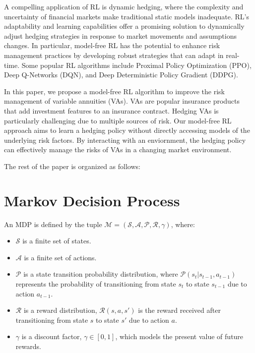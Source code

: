 A compelling application of RL is dynamic hedging, where the complexity and uncertainty of financial markets make traditional static models inadequate.
RL's adaptability and learning capabilities offer a promising solution to dynamically adjust hedging strategies in response to market movements and assumptions changes.
In particular, model-free RL has the potential to enhance risk management practices by developing robust strategies that can adapt in real-time.
Some popular RL algorithms include Proximal Policy Optimization (PPO), Deep Q-Networks (DQN), and Deep Deterministic Policy Gradient (DDPG).

In this paper, we propose a model-free RL algorithm to improve the risk management of variable annuities (VAs).
VAs are popular insurance products that add investment features to an insurance contract.
Hedging VAs is particularly challenging due to multiple sources of risk.
Our model-free RL approach aims to learn a hedging policy without directly accessing models of the underlying risk factors.
By interacting with an enviornment, the hedging policy can effectively manage the risks of VAs in a changing market environment.

The rest of the paper is organized as follows: 

\section{Markov Decision Process}

An MDP is defined by the tuple $\mathcal{M} = (\mathcal{S}, \mathcal{A}, \mathcal{P}, \mathcal{R}, \gamma)$, where:

\begin{itemize}
    \item $\mathcal{S}$ is a finite set of states.
    \item $\mathcal{A}$ is a finite set of actions.
    \item $\mathcal{P}$ is a state transition probability distribution, where $\mathcal{P}(s_{t}|s_{t-1}, a_{t-1})$ represents the probability of transitioning from state $s_t$ to state $s_{t-1}$ due to action $a_{t-1}$.
    \item $\mathcal{R}$ is a reward distribution, $\mathcal{R}(s, a, s')$ is the reward received after transitioning from state $s$ to state $s'$ due to action $a$.
    \item $\gamma$ is a discount factor, $\gamma \in [0,1]$,  which models the present value of future rewards.
\end{itemize}

